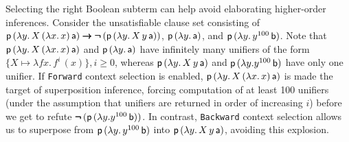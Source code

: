 \documentclass[smallcondensed,draft]{svjour3}     %
\begin{document}
\begin{examplex}
  Selecting the right Boolean subterm can help avoid elaborating
  high\-er-order inferences. Consider the unsatisfiable clause set consisting of $\mathsf{p} \, (\lambda y.\, X
  \, (\lambda x.\, x) \, \mathsf{a}) \pmb\rightarrow\allowbreak \pmb{\neg\,}(\mathsf{p} \, (\lambda y. \allowbreak\, X
  \, y \, \mathsf{a}))$, $\mathsf{p} \, (\lambda y.\, \mathsf{a})$, and
  $\mathsf{p} \, (\lambda y. \, y^{100} \, \mathsf{b})$.
  Note that $\mathsf{p} \, (\lambda y.\, X
  \, (\lambda x.\, x) \, \mathsf{a})$ and $\mathsf{p} \,
  (\lambda y.\, \mathsf{a})$ have infinitely many unifiers of the form $\{ X \mapsto \lambda fx.
  \, f^i\, (x) \}, i \geq 0$, whereas $\mathsf{p} \, (\lambda y. \, X
  \, y \, \mathsf{a})$ and $\mathsf{p} \, (\lambda y. y^{100} \, \mathsf{b})$ have only one unifier. 
  If \texttt{Forward} context selection is enabled,
  $\mathsf{p} \, (\lambda y.\, X \, (\lambda x.\, x) \, \mathsf{a})$ is made the target of superposition inference, 
  forcing computation of at least 100 unifiers (under the assumption that
  unifiers are returned in order of increasing $i$) before we get to refute
  $\pmb{\neg\,}(\mathsf{p} \, (\lambda y. y^{100} \, \mathsf{b}))$.
  In contrast, \texttt{Backward} context selection allows us to
  superpose from $\mathsf{p} \, (\lambda y. \, y^{100} \, \mathsf{b})$ into $\mathsf{p} \, (\lambda y. \, X
  \, y \, \mathsf{a})$, avoiding this explosion. 
\end{examplex}

\end{document}
